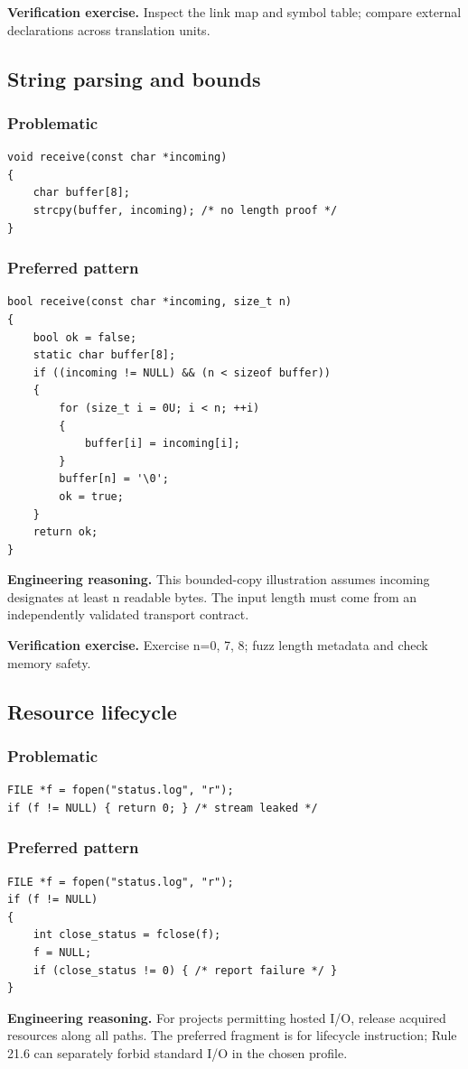 \documentclass[10pt,letterpaper]{article}
\begin{document}
\textbf{Verification exercise.} Inspect the link map and symbol table; compare external declarations across translation units.

\subsection{String parsing and bounds}
\subsubsection*{Problematic}
\begin{lstlisting}[style=engineerc]
void receive(const char *incoming)
{
    char buffer[8];
    strcpy(buffer, incoming); /* no length proof */
}
\end{lstlisting}
\subsubsection*{Preferred pattern}
\begin{lstlisting}[style=engineerc]
bool receive(const char *incoming, size_t n)
{
    bool ok = false;
    static char buffer[8];
    if ((incoming != NULL) && (n < sizeof buffer))
    {
        for (size_t i = 0U; i < n; ++i)
        {
            buffer[i] = incoming[i];
        }
        buffer[n] = '\0';
        ok = true;
    }
    return ok;
}
\end{lstlisting}
\textbf{Engineering reasoning.} This bounded-copy illustration assumes incoming designates at least n readable bytes. The input length must come from an independently validated transport contract.

\textbf{Verification exercise.} Exercise n=0, 7, 8; fuzz length metadata and check memory safety.

\subsection{Resource lifecycle}
\subsubsection*{Problematic}
\begin{lstlisting}[style=engineerc]
FILE *f = fopen("status.log", "r");
if (f != NULL) { return 0; } /* stream leaked */
\end{lstlisting}
\subsubsection*{Preferred pattern}
\begin{lstlisting}[style=engineerc]
FILE *f = fopen("status.log", "r");
if (f != NULL)
{
    int close_status = fclose(f);
    f = NULL;
    if (close_status != 0) { /* report failure */ }
}
\end{lstlisting}
\textbf{Engineering reasoning.} For projects permitting hosted I/O, release acquired resources along all paths. The preferred fragment is for lifecycle instruction; Rule 21.6 can separately forbid standard I/O in the chosen profile.
\end{document}
